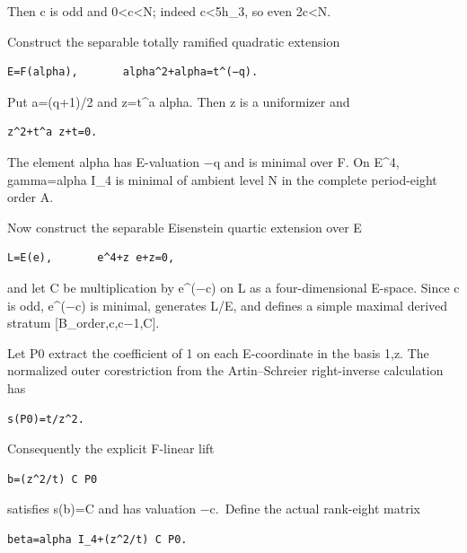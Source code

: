 Then c is odd and 0\textless c\textless N; indeed c\textless5h\_3, so
even 2c\textless N.

Construct the separable totally ramified quadratic extension

\begin{Verbatim}[fontsize=\small,breaklines=true,breakanywhere=true]
E=F(alpha),       alpha^2+alpha=t^(−q).
\end{Verbatim}

Put a=(q+1)/2 and z=t\^{}a alpha. Then z is a uniformizer and

\begin{Verbatim}[fontsize=\small,breaklines=true,breakanywhere=true]
z^2+t^a z+t=0.
\end{Verbatim}

The element alpha has E-valuation −q and is minimal over F. On E\^{}4,
gamma=alpha I\_4 is minimal of ambient level N in the complete
period-eight order A.

Now construct the separable Eisenstein quartic extension over E

\begin{Verbatim}[fontsize=\small,breaklines=true,breakanywhere=true]
L=E(e),       e^4+z e+z=0,
\end{Verbatim}

and let C be multiplication by e\^{}(−c) on L as a four-dimensional
E-space. Since c is odd, e\^{}(−c) is minimal, generates L/E, and
defines a simple maximal derived stratum {[}B\_order,c,c−1,C{]}.

Let P0 extract the coefficient of 1 on each E-coordinate in the basis
1,z. The normalized outer corestriction from the Artin--Schreier
right-inverse calculation has

\begin{Verbatim}[fontsize=\small,breaklines=true,breakanywhere=true]
s(P0)=t/z^2.
\end{Verbatim}

Consequently the explicit F-linear lift

\begin{Verbatim}[fontsize=\small,breaklines=true,breakanywhere=true]
b=(z^2/t) C P0
\end{Verbatim}

satisfies s(b)=C and has valuation −c.~Define the actual rank-eight
matrix

\begin{Verbatim}[fontsize=\small,breaklines=true,breakanywhere=true]
beta=alpha I_4+(z^2/t) C P0.
\end{Verbatim}

